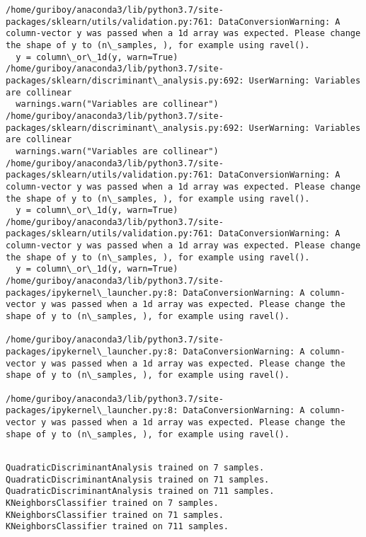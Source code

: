 \documentclass[11pt]{article}
\begin{document}
    \begin{Verbatim}[commandchars=\\\{\}]
/home/guriboy/anaconda3/lib/python3.7/site-packages/sklearn/utils/validation.py:761: DataConversionWarning: A column-vector y was passed when a 1d array was expected. Please change the shape of y to (n\_samples, ), for example using ravel().
  y = column\_or\_1d(y, warn=True)
/home/guriboy/anaconda3/lib/python3.7/site-packages/sklearn/discriminant\_analysis.py:692: UserWarning: Variables are collinear
  warnings.warn("Variables are collinear")
/home/guriboy/anaconda3/lib/python3.7/site-packages/sklearn/discriminant\_analysis.py:692: UserWarning: Variables are collinear
  warnings.warn("Variables are collinear")
/home/guriboy/anaconda3/lib/python3.7/site-packages/sklearn/utils/validation.py:761: DataConversionWarning: A column-vector y was passed when a 1d array was expected. Please change the shape of y to (n\_samples, ), for example using ravel().
  y = column\_or\_1d(y, warn=True)
/home/guriboy/anaconda3/lib/python3.7/site-packages/sklearn/utils/validation.py:761: DataConversionWarning: A column-vector y was passed when a 1d array was expected. Please change the shape of y to (n\_samples, ), for example using ravel().
  y = column\_or\_1d(y, warn=True)
/home/guriboy/anaconda3/lib/python3.7/site-packages/ipykernel\_launcher.py:8: DataConversionWarning: A column-vector y was passed when a 1d array was expected. Please change the shape of y to (n\_samples, ), for example using ravel().
  
/home/guriboy/anaconda3/lib/python3.7/site-packages/ipykernel\_launcher.py:8: DataConversionWarning: A column-vector y was passed when a 1d array was expected. Please change the shape of y to (n\_samples, ), for example using ravel().
  
/home/guriboy/anaconda3/lib/python3.7/site-packages/ipykernel\_launcher.py:8: DataConversionWarning: A column-vector y was passed when a 1d array was expected. Please change the shape of y to (n\_samples, ), for example using ravel().
  

    \end{Verbatim}

    \begin{Verbatim}[commandchars=\\\{\}]
QuadraticDiscriminantAnalysis trained on 7 samples.
QuadraticDiscriminantAnalysis trained on 71 samples.
QuadraticDiscriminantAnalysis trained on 711 samples.
KNeighborsClassifier trained on 7 samples.
KNeighborsClassifier trained on 71 samples.
KNeighborsClassifier trained on 711 samples.

    \end{Verbatim}
\end{document}
